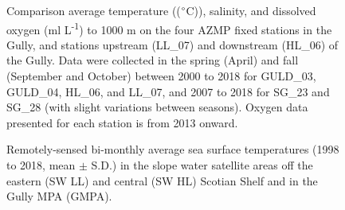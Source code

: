 \documentclass[12pt]{article}\usepackage[]{graphicx}\usepackage[]{color}
\begin{document}
\begin{landscapepage}
\begin{figure}[htb]

{\centering {} 

}

\caption{Comparison average temperature ((\(\degree\)C)), salinity, and dissolved oxygen (ml L\textsuperscript{-1}) to 1000 m on the four AZMP fixed stations in the Gully, and stations upstream (LL\_07) and downstream (HL\_06) of the Gully. Data were collected in the spring (April) and fall (September and October) between 2000 to 2018 for GULD\_03, GULD\_04, HL\_06, and LL\_07, and 2007 to 2018 for SG\_23 and SG\_28 (with slight variations between seasons). Oxygen data presented for each station is from 2013 onward.}\label{fig:figure13}
\end{figure}
\end{landscapepage}
\clearpage


\begin{figure}[htb]

{\centering {} 

}

\caption{Remotely-sensed bi-monthly average sea surface temperatures (1998 to 2018, mean \(\pm\) S.D.) in the slope water satellite areas off the eastern (SW LL) and central (SW HL) Scotian Shelf and in the Gully MPA (GMPA).}\label{fig:figure14}
\end{figure}
\clearpage
\end{document}

